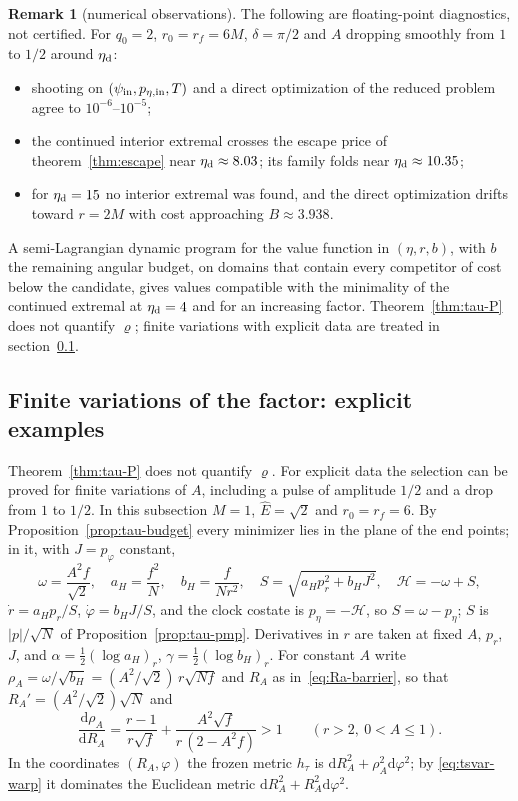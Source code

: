 \documentclass[aip,jmp,amsmath,amssymb,reprint]{revtex4-2}
\newcommand{\Ehat}{\hat E}
\newcommand{\dd}{\mathrm{d}}
\theoremstyle{plain}
\theoremstyle{definition}
\newtheorem{remark}[proposition]{Remark}
\begin{document}
\begin{remark}[numerical observations]\label{rmk:tau-var-num}
The following are floating-point diagnostics, not certified. For $q_0=2$,
$r_0=r_f=6M$, $\delta=\pi/2$ and $A$ dropping smoothly from $1$ to $1/2$ around $\eta_{\rm d}$:
\begin{itemize}
\item shooting on $(\psi_{\rm in},p_{\eta,{\rm in}},T)$ and a direct optimization of the reduced problem
  agree to $10^{-6}$--$10^{-5}$;
\item the continued interior extremal crosses the escape price of theorem~\ref{thm:escape} near
  $\eta_{\rm d}\approx8.03$; its family folds near $\eta_{\rm d}\approx10.35$;
\item for $\eta_{\rm d}=15$ no interior extremal was found, and the direct optimization drifts
  toward $r=2M$ with cost approaching $B\approx3.938$.
\end{itemize}
A semi-Lagrangian dynamic program for the value function in $(\eta,r,b)$, with $b$ the
remaining angular budget, on domains that contain every competitor of cost below the
candidate, gives values compatible with the minimality of the continued extremal at
$\eta_{\rm d}=4$ and for an increasing factor. Theorem~\ref{thm:tau-P} does not quantify $\varrho$; finite
variations with explicit data are treated in section~\ref{sec:tau-var-finite}.
\end{remark}

\subsection{Finite variations of the factor: explicit examples}
\label{sec:tau-var-finite}
Theorem~\ref{thm:tau-P} does not quantify $\varrho$. For explicit data the selection can be proved
for finite variations of $A$, including a pulse of amplitude $1/2$ and a drop from $1$ to $1/2$. In this
subsection $M=1$, $\Ehat=\sqrt2$ and $r_0=r_f=6$. By Proposition~\ref{prop:tau-budget} every minimizer
lies in the plane of the end points; in it, with $J=p_\varphi$ constant,
\[
  \omega=\frac{A^2f}{\sqrt2},\quad a_H=\frac{f^2}{N},\quad b_H=\frac f{Nr^2},\quad
  S=\sqrt{a_Hp_r^2+b_HJ^2},\quad \mathcal H=-\omega+S,
\]
$\dot r=a_Hp_r/S$, $\dot\varphi=b_HJ/S$, and the clock costate is $p_\eta=-\mathcal H$, so $S=\omega-p_\eta$; $S$ is
$|p|/\sqrt N$ of Proposition~\ref{prop:tau-pmp}. Derivatives in $r$ are taken at fixed $A$, $p_r$, $J$,
and $\alpha=\frac12(\log a_H)_r$, $\gamma=\frac12(\log b_H)_r$. For constant $A$ write
$\rho_A=\omega/\sqrt{b_H}=(A^2/\sqrt2)\,r\sqrt{Nf}$ and $R_A$ as in~\eqref{eq:Ra-barrier}, so that
$R_A'=(A^2/\sqrt2)\sqrt N$ and
\begin{equation}
  \frac{\dd\rho_A}{\dd R_A}=\frac{r-1}{r\sqrt f}+\frac{A^2\sqrt f}{r\,(2-A^2f)}>1\qquad(r>2,\ 0<A\le1).
  \label{eq:tsvar-warp}
\end{equation}
In the coordinates $(R_A,\varphi)$ the frozen metric $h_\tau$ is $\dd R_A^2+\rho_A^2\dd\varphi^2$; by
\eqref{eq:tsvar-warp} it dominates the Euclidean metric $\dd R_A^2+R_A^2\dd\varphi^2$.
\end{document}
